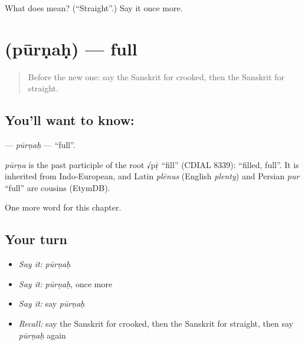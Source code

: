 \begin{tcolorbox}[breakable,colback=teal!4,colframe=teal!35!black,title={Before you move on}]
What does  mean? (\textquotedblleft{}Straight\textquotedblright{}.) Say it once more.
\end{tcolorbox}
\section[\texorpdfstring{\sk{पूर्णः} (pūrṇaḥ)}{पूर्णः (pūrṇaḥ)}]{ (pūrṇaḥ) — full}

\label{lesson:SA-C132-purnah}



\begin{quote}
Before the new one: say the Sanskrit for crooked, then the Sanskrit for straight.
\end{quote}

\subsection*{You'll want to know: }
\textbf{} — \emph{pūrṇaḥ} — \textquotedblleft{}full\textquotedblright{}.

\begin{cousinweb}
\emph{pūrṇa} is the past participle of the root √pṝ \textquotedblleft{}fill\textquotedblright{} (CDIAL 8339): \textquotedblleft{}filled, full\textquotedblright{}. It is inherited from Indo-European, and Latin \emph{plēnus} (English \emph{plenty}) and Persian \emph{pur} \textquotedblleft{}full\textquotedblright{} are cousins (EtymDB).
\end{cousinweb}

\begin{grammarlens}[title={What you've built}]
One more word for this chapter.
\end{grammarlens}

\subsection*{Your turn}
\begin{itemize}
\raggedright
  \item \emph{Say it:} \emph{pūrṇaḥ}
  \item \emph{Say it:} \emph{pūrṇaḥ}, once more
  \item \emph{Say it:} say \emph{pūrṇaḥ}
  \item \emph{Recall:} say the Sanskrit for crooked, then the Sanskrit for straight, then say \emph{pūrṇaḥ} again
\end{itemize}

